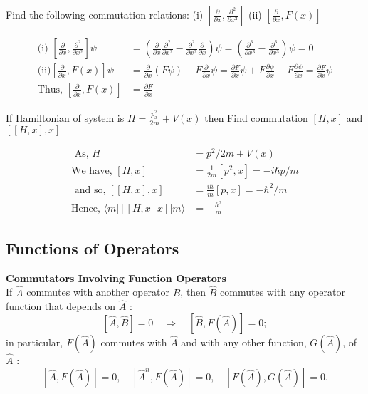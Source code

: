\begin{exercise}
 Find the following commutation relations:
	(i) $\left[\frac{\partial}{\partial x}, \frac{\partial^{2}}{\partial x^{2}}\right]$
	(ii) $\left[\frac{\partial}{\partial x}, F(x)\right]$
\end{exercise}
\begin{answer}
	\begin{align*}
	\text{(i) }\left[\frac{\partial}{\partial x}, \frac{\partial^{2}}{\partial x^{2}}\right] \psi&=\left(\frac{\partial}{\partial x} \frac{\partial^{2}}{\partial x^{2}}-\frac{\partial^{2}}{\partial x^{2}} \frac{\partial}{\partial x}\right) \psi=\left(\frac{\partial^{3}}{\partial x^{3}}-\frac{\partial^{3}}{\partial x^{3}}\right) \psi=0\\
	\text{(ii)} \left[\frac{\partial}{\partial x}, F(x)\right] \psi&=\frac{\partial}{\partial x}(F \psi)-F \frac{\partial}{\partial x} \psi=\frac{\partial F}{\partial x} \psi+F \frac{\partial \psi}{\partial x}-F \frac{\partial \psi}{\partial x}=\frac{\partial F}{\partial x} \psi\\
	\text{Thus, }\left[\frac{\partial}{\partial x}, F(x)\right]&=\frac{\partial F}{\partial x}
	\end{align*}
\end{answer}
\begin{exercise}
	If Hamiltonian of system is $H=\frac{p_{x}^{2}}{2 m}+V(x)$ then Find commutation $[H, x]$ and $[[H, x], x]$
\end{exercise}
\begin{answer}
	\begin{align*}
	\text{ As, }H&=p^{2} / 2 m+V(x)\\
	\text{We have, }[H, x]&=\frac{1}{2 m}\left[p^{2}, x\right]=-i \hbar p / m \\
\text{	and so, }[[H, x], x]&=\frac{i \hbar}{m}[p, x]=-\hbar^{2} / m\\
	\text{Hence, }\langle m|[[H, x] x]| m\rangle&=-\frac{\hbar^{2}}{m}
	\end{align*}
\end{answer}
\subsection{Functions of Operators}
\textbf{Commutators Involving Function Operators}\\
If $\hat{A}$ commutes with another operator $\hat{B}$, then $\hat{B}$ commutes with any operator function that depends on $\hat{A}$ :
$$
[\hat{A}, \hat{B}]=0 \quad \Longrightarrow \quad[\hat{B}, F(\hat{A})]=0 ;
$$
in particular, $F(\hat{A})$ commutes with $\hat{A}$ and with any other function, $G(\hat{A})$, of $\hat{A}$ :
$$
[\hat{A}, F(\hat{A})]=0, \quad\left[\hat{A}^{n}, F(\hat{A})\right]=0, \quad[F(\hat{A}), G(\hat{A})]=0 .
$$
